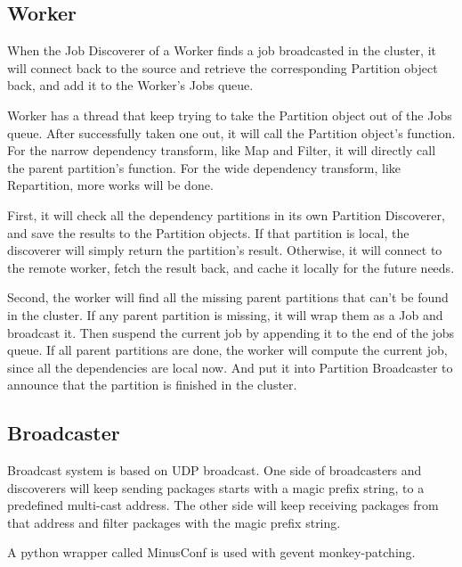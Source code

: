 \subsection{Worker} %
\label{sub:worker}
When the Job Discoverer of a Worker finds a job broadcasted in the cluster,
it will connect back to the source and retrieve the corresponding Partition object back,
and add it to the Worker's Jobs queue.

Worker has a thread that keep trying to take the Partition object out of the Jobs queue.
After successfully taken one out, it will call the Partition object's function.
For the narrow dependency transform, like Map and Filter, it will directly call the parent partition's function.
For the wide dependency transform, like Repartition, more works will be done.

First, it will check all the dependency partitions in its own Partition Discoverer,
and save the results to the Partition objects.
If that partition is local, the discoverer will simply return the partition's result.
Otherwise, it will connect to the remote worker, fetch the result back, and cache it locally for the future needs.

Second, the worker will find all the missing parent partitions that can't be found in the cluster.
If any parent partition is missing, it will wrap them as a Job and broadcast it.
Then suspend the current job by appending it to the end of the jobs queue.
If all parent partitions are done, the worker will compute the current job, since all the dependencies are local now.
And put it into Partition Broadcaster to announce that the partition is finished in the cluster.

\subsection{Broadcaster} %
\label{sub:broadcaster}
Broadcast system is based on UDP broadcast.
One side of broadcasters and discoverers will keep sending packages starts with a magic prefix string,
to a predefined multi-cast address.
The other side will keep receiving packages from that address and filter packages with the magic prefix string.

A python wrapper called MinusConf\cite{minusconf} is used with gevent monkey-patching.

